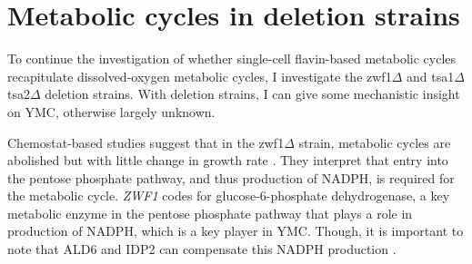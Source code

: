 \section{Metabolic cycles in deletion strains}
\label{sec:biology-deletions}


To continue the investigation of whether single-cell flavin-based metabolic cycles recapitulate dissolved-oxygen metabolic cycles, I investigate the zwf1$\Delta$ and tsa1$\Delta$ tsa2$\Delta$ deletion strains.
With deletion strains, I can give some mechanistic insight on YMC, otherwise largely unknown.

Chemostat-based studies suggest that in the zwf1$\Delta$ strain, metabolic cycles are abolished but with little change in growth rate \parencite{tuCyclicChangesMetabolic2007}.
They interpret that entry into the pentose phosphate pathway, and thus production of NADPH, is required for the metabolic cycle.
\textit{ZWF1} codes for glucose-6-phosphate dehydrogenase, a key metabolic enzyme in the pentose phosphate pathway that plays a role in production of NADPH, which is a key player in YMC.
Though, it is important to note that ALD6 and IDP2 can compensate this NADPH production \parencite{minardSourcesNADPHYeast2005}.


